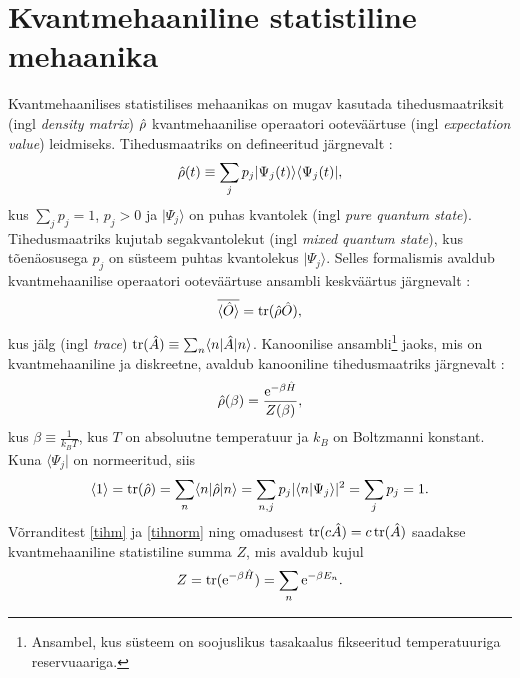 \documentclass{trkut}%
\DeclareMathOperator{\tr}{tr}
\renewcommand\bra[1]{{\langle{#1}|}}
\renewcommand\ket[1]{{|{#1}\rangle}}
\renewcommand\braket[1]{\langle{#1}\rangle}
\begin{document}
\section{Kvantmehaaniline statistiline mehaanika}

Kvantmehaanilises statistilises mehaanikas on mugav kasutada tihedusmaatriksit (ingl \textit{density matrix}) $\op{\rho}$ kvantmehaanilise operaatori ooteväärtuse (ingl \textit{expectation value}) leidmiseks.
Tihedusmaatriks on defineeritud järgnevalt \parencite[172]{kardar07}:
\begin{equation}
    \op{\rho}(t) \equiv \sum_j p_j \ket{\Psi_j(t)} \bra{\Psi_j(t)},
\end{equation}
kus $\sum_j p_j=1$, $p_j > 0$ ja $\ket{\Psi_j}$ on puhas kvantolek (ingl \textit{pure quantum state}).
Tihedusmaatriks kujutab segakvantolekut (ingl \textit{mixed quantum state}), kus tõenäosusega $p_j$ on süsteem puhtas kvantolekus $\ket{\Psi_j}$.
Selles formalismis avaldub kvantmehaanilise operaatori ooteväärtuse ansambli keskväärtus järgnevalt \parencite[172]{kardar07}:
\begin{equation}
    \overline{\braket{\op{O}}}=\tr(\op{\rho}\op{O}),
    \label{ootev}
\end{equation}
kus jälg (ingl \textit{trace}) $\tr(\op{A}) \equiv \sum_n \braket{n|\op{A}|n}$. %
Kanoonilise ansambli\footnote{Ansambel, kus süsteem on soojuslikus tasakaalus fikseeritud temperatuuriga reservuaariga.} jaoks, mis on kvantmehaaniline ja diskreetne, avaldub kanooniline tihedusmaatriks järgnevalt \parencite[174]{kardar07}:
\begin{equation}
    \op{\rho}(\beta) = \frac{\mathrm{e}^{-\beta \op{H}}}{Z(\beta)},
    \label{tihm}
\end{equation}
kus $\beta \equiv \frac{1}{k_B T}$, kus $T$ on absoluutne temperatuur ja $k_B$ on Boltzmanni konstant.
Kuna $\bra{\Psi_j}$ on normeeritud, siis
\begin{equation}
    \braket{1}=\tr(\op{\rho})=\sum_n \braket{n|\op{\rho}|n}=\sum_{n, j} p_j |\braket{n| \Psi_j}|^2=\sum_j p_j=1.
    \label{tihnorm}
\end{equation}
Võrranditest \eqref{tihm} ja \eqref{tihnorm} ning omadusest $\tr(c\op{A})=c\tr(\op{A})$ saadakse kvantmehaaniline statistiline summa $Z$, mis avaldub kujul
\begin{equation}
    Z=\tr(\mathrm{e}^{-\beta \op{H}})=\sum_n \mathrm{e}^{-\beta E_n}.
    \label{part}
\end{equation}
\end{document}
